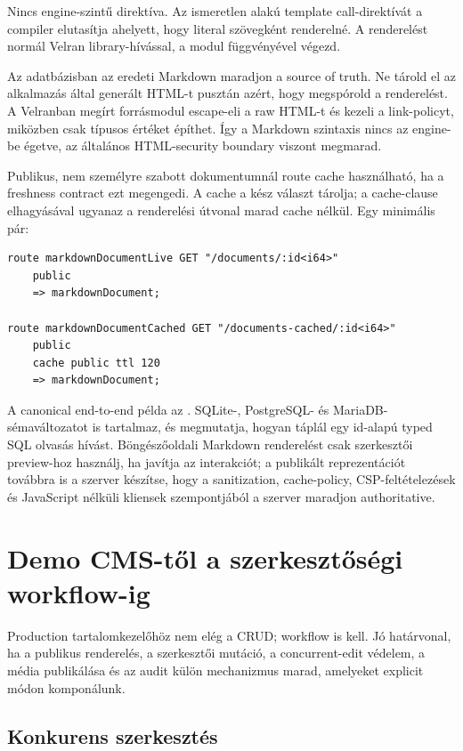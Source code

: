Nincs engine-szintű  direktíva. Az ismeretlen  alakú template call-direktívát a compiler elutasítja ahelyett, hogy literal szövegként renderelné. A renderelést normál Velran library-hívással, a  modul  függvényével végezd.

Az adatbázisban az eredeti Markdown maradjon a source of truth. Ne tárold el az alkalmazás által generált HTML-t pusztán azért, hogy megspórold a renderelést. A Velranban megírt forrásmodul escape-eli a raw HTML-t és kezeli a link-policyt, miközben csak típusos  értéket építhet. Így a Markdown szintaxis nincs az engine-be égetve, az általános HTML-security boundary viszont megmarad.

Publikus, nem személyre szabott dokumentumnál route cache használható, ha a freshness contract ezt megengedi. A cache a kész választ tárolja; a cache-clause elhagyásával ugyanaz a renderelési útvonal marad cache nélkül. Egy minimális pár:

\begin{lstlisting}[language=Velran]
route markdownDocumentLive GET "/documents/:id<i64>"
    public
    => markdownDocument;

route markdownDocumentCached GET "/documents-cached/:id<i64>"
    public
    cache public ttl 120
    => markdownDocument;
\end{lstlisting}

A canonical end-to-end példa az . SQLite-, PostgreSQL- és MariaDB-sémaváltozatot is tartalmaz, és megmutatja, hogyan táplál egy id-alapú typed SQL olvasás  hívást. Böngészőoldali Markdown renderelést csak szerkesztői preview-hoz használj, ha javítja az interakciót; a publikált reprezentációt továbbra is a szerver készítse, hogy a sanitization, cache-policy, CSP-feltételezések és JavaScript nélküli kliensek szempontjából a szerver maradjon authoritative.

\section{Demo CMS-től a szerkesztőségi workflow-ig}

Production tartalomkezelőhöz nem elég a CRUD; workflow is kell. Jó határvonal, ha a publikus renderelés, a szerkesztői mutáció, a concurrent-edit védelem, a média publikálása és az audit külön mechanizmus marad, amelyeket explicit módon komponálunk.

\subsection*{Konkurens szerkesztés}

